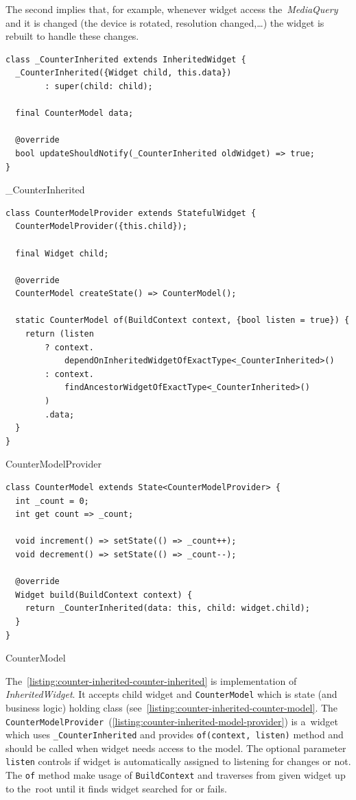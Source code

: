 The second implies that, for example, whenever widget access the~\textit{MediaQuery} and it is changed (the device is rotated, resolution changed,\ldots) the widget is rebuilt to handle these changes. 

\begin{listing}[ht]
\begin{verbatim}
class _CounterInherited extends InheritedWidget {
  _CounterInherited({Widget child, this.data}) 
        : super(child: child);

  final CounterModel data;

  @override
  bool updateShouldNotify(_CounterInherited oldWidget) => true;
}
\end{verbatim}
\caption{\_CounterInherited}
\label{listing:counter-inherited-counter-inherited}
\end{listing}

\begin{listing}[ht]
\begin{verbatim}
class CounterModelProvider extends StatefulWidget {
  CounterModelProvider({this.child});
  
  final Widget child;
  
  @override
  CounterModel createState() => CounterModel();

  static CounterModel of(BuildContext context, {bool listen = true}) {
    return (listen
        ? context.
            dependOnInheritedWidgetOfExactType<_CounterInherited>()
        : context.
            findAncestorWidgetOfExactType<_CounterInherited>()
        )
        .data;
  }
}
\end{verbatim}
\caption{CounterModelProvider}
\label{listing:counter-inherited-model-provider}
\end{listing}

\begin{listing}[ht]
\begin{verbatim}
class CounterModel extends State<CounterModelProvider> {
  int _count = 0;
  int get count => _count;

  void increment() => setState(() => _count++);
  void decrement() => setState(() => _count--);

  @override
  Widget build(BuildContext context) {
    return _CounterInherited(data: this, child: widget.child);
  }
}
\end{verbatim}
\caption{CounterModel}
\label{listing:counter-inherited-counter-model}
\end{listing}

The~\cref{listing:counter-inherited-counter-inherited} is implementation of \textit{InheritedWidget}. It accepts child widget and \verb|CounterModel| which is state (and business logic) holding class (see~\cref{listing:counter-inherited-counter-model}. The \verb|CounterModelProvider|~(\cref{listing:counter-inherited-model-provider}) is a~widget which uses \verb|_CounterInherited| and provides \verb|of(context, listen)| method and should be called when widget needs access to the model. The optional parameter \verb|listen| controls if widget is automatically assigned to listening for changes or not. The \verb|of| method make usage of \verb|BuildContext| and traverses from given widget up to the~root until it finds widget searched for or fails. 

